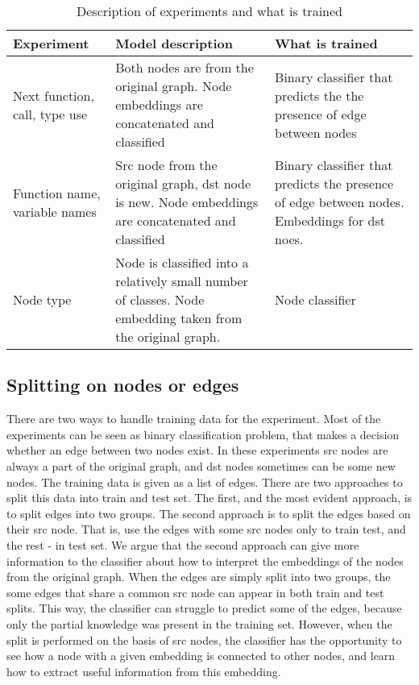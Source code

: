 \documentclass[a4paper,twoside]{article}
\begin{document}
\begin{table*}
    \centering
    \caption{Description of experiments and what is trained \label{tbl:experiment_desc}}
    \begin{tabular}{|p{3cm}|p{6cm}|p{6cm}|}
    \hline
        \textbf{Experiment} & \textbf{Model description} & \textbf{What is trained} \\ \hline
        Next function, call, type use & Both nodes are from the original graph. Node embeddings are concatenated and classified & Binary classifier that predicts the the presence of edge between nodes \\ \hline
        Function name, variable names & Src node from the original graph, dst node is new. Node embeddings are concatenated and classified & Binary classifier that predicts the presence of edge between nodes. Embeddings for dst noes. \\ \hline
        Node type & Node is classified into a relatively small number of classes. Node embedding taken from the original graph. & Node classifier \\ \hline
    \end{tabular}
\end{table*}

\subsection{Splitting on nodes or edges}

There are two ways to handle training data for the experiment. Most of the experiments can be seen as binary classification problem, that makes a decision whether an edge between two nodes exist. In these experiments src nodes are always a part of the original graph, and dst nodes sometimes can be some new nodes. The training data is given as a list of edges. There are two approaches to split this data into train and test set. The first, and the most evident approach, is to split edges into two groups. The second approach is to split the edges based on their src node. That is, use the edges with some src nodes only to train test, and the rest - in test set. 
We argue that the second approach can give more information to the classifier about how to interpret the embeddings of the nodes from the original graph. When the edges are simply split into two groups, the some edges that share a common src node can appear in both train and test splits. This way, the classifier can struggle to predict some of the edges, because only the partial knowledge was present in the training set. However, when the split is performed on the basis of src nodes, the classifier has the opportunity to see how a node with a given embedding is connected to other nodes, and learn how to extract useful information from this embedding. 
\end{document}
